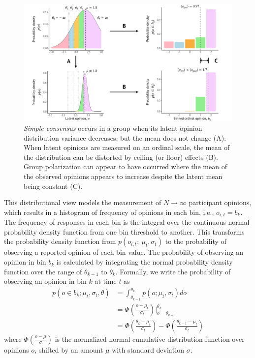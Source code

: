 \documentclass[11pt, letterpaper]{article}
\begin{document}
\begin{figure}
  \caption{\emph{Simple consensus} occurs in a group when its latent opinion
  distribution variance decreases, but the mean does not change (A). When 
latent opinions are measured on an ordinal scale, the mean of the distribution
can be distorted by ceiling (or floor) effects (B). Group polarization 
can appear to have occurred where the mean of the observed opinions appears
to increase despite the latent mean being constant (C).}
  \label{fig:consensusDistroIllustration}
  \vspace{1em}
  \centering
    \includegraphics[width=1.0\textwidth]{ConsensusDistroIllustration/figure.pdf}
\end{figure}

This distributional view models the measurement of $N \to \infty$ participant opinions,
which results in a histogram of frequency of opinions
in each bin, i.e., $o_{i,t} = b_k$. The frequency of responses in each bin is 
the integral over the continuous normal probability density function from 
one bin threshold to another. This transforms the probability density 
function from $p(o_{i,t};~\mu_t, \sigma_t)$ to the probability
of observing a reported opinion of each bin value. 
The probability of observing an opinion in bin
$b_k$ is calculated by integrating the normal probability density 
function over the range of $\theta_{k-1}$ to $\theta_{k}$. 
Formally, we write the 
probability of observing an opinion in bin $k$ at time $t$ as
\begin{equation}
\begin{aligned}
  p(o \in b_k; \mu_t, \sigma_t, \theta) 
    &= \int_{\theta_{k-1}}^{\theta_k} p(o;\mu_t, \sigma_t) do \\
    &= \Phi \left( \frac{o - \mu_t}{\sigma_t} \right)\Big|_{o=\theta_{k-1}}^{\theta_k} \\
    &= \Phi \left( \frac{\theta_k - \mu_t}{\sigma_t} \right) - 
       \Phi \left( \frac{\theta_{k-1} - \mu_t}{\sigma_t} \right)
\end{aligned}
\label{eq:binFrequency}
\end{equation}
\noindent
where $\Phi(\frac{o - \mu}{\sigma})$ is the normalized 
normal cumulative distribution function over opinions $o$, shifted by an amount $\mu$ with
standard deviation $\sigma$. 
\end{document}
